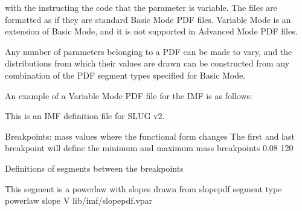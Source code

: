 \documentclass[letterpaper,10pt,english]{sphinxmanual}
\begin{document}
with the  instructing the code that the parameter is variable. The  files are formatted as if they are standard Basic Mode PDF files. Variable Mode is an extension of Basic Mode, and it is not supported in Advanced Mode PDF files.

Any number of parameters belonging to a PDF can be made to vary, and the distributions from which their values are drawn can be constructed from any combination of the PDF segment types specified for Basic Mode.

An example of a Variable Mode PDF file for the IMF is as follows:

\begin{sphinxVerbatim}[commandchars=\\\{\}]
\PYGZsh{}\PYGZsh{}\PYGZsh{}\PYGZsh{}\PYGZsh{}\PYGZsh{}\PYGZsh{}\PYGZsh{}\PYGZsh{}\PYGZsh{}\PYGZsh{}\PYGZsh{}\PYGZsh{}\PYGZsh{}\PYGZsh{}\PYGZsh{}\PYGZsh{}\PYGZsh{}\PYGZsh{}\PYGZsh{}\PYGZsh{}\PYGZsh{}\PYGZsh{}\PYGZsh{}\PYGZsh{}\PYGZsh{}\PYGZsh{}\PYGZsh{}\PYGZsh{}\PYGZsh{}\PYGZsh{}\PYGZsh{}\PYGZsh{}\PYGZsh{}\PYGZsh{}\PYGZsh{}\PYGZsh{}\PYGZsh{}\PYGZsh{}\PYGZsh{}\PYGZsh{}\PYGZsh{}\PYGZsh{}\PYGZsh{}\PYGZsh{}\PYGZsh{}\PYGZsh{}\PYGZsh{}\PYGZsh{}\PYGZsh{}\PYGZsh{}\PYGZsh{}\PYGZsh{}\PYGZsh{}\PYGZsh{}\PYGZsh{}\PYGZsh{}\PYGZsh{}\PYGZsh{}\PYGZsh{}\PYGZsh{}\PYGZsh{}\PYGZsh{}
\PYGZsh{} This is an IMF definition file for SLUG v2.

\PYGZsh{} Breakpoints: mass values where the functional form changes
\PYGZsh{} The first and last breakpoint will define the minimum and
\PYGZsh{} maximum mass
breakpoints 0.08 120

\PYGZsh{} Definitions of segments between the breakpoints

\PYGZsh{} This segment is a powerlaw with slopes drawn from slope\PYGZus{}pdf
segment
type powerlaw
slope V lib/imf/slope\PYGZus{}pdf.vpar
\end{sphinxVerbatim}
\end{document}
